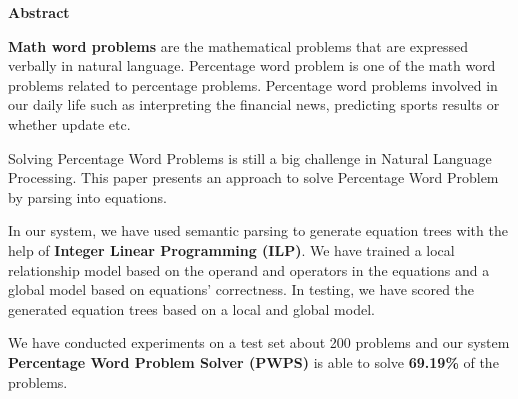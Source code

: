 \documentclass[document.tex]{subfiles}
\begin{document}
	\begin{center}
		\textbf{{\fontsize{16pt}{18}\selectfont Abstract}}
		\vspace{1cm}
	\end{center}
	
	\noindent \textbf{Math word problems} are the mathematical problems
	that are expressed verbally in natural language. Percentage word problem is one of the math word problems related to percentage problems. Percentage word problems involved in our daily life such as interpreting the financial news, predicting sports results or whether update etc. 
	
	
	\noindent Solving Percentage Word Problems is still a big challenge in Natural Language Processing. This paper	presents an approach to solve Percentage Word Problem by parsing into equations. 
	
	\noindent In our system, we have used semantic parsing to generate equation trees with the help of \textbf{Integer Linear Programming (ILP)}. We have trained a local relationship model
	based on the operand and operators in the equations and a global model based on equations’ correctness. In testing, we have scored the generated equation trees based on a local and global model.
	
	\noindent We have conducted experiments on a test set about 200 problems and our system \textbf{Percentage Word Problem Solver (PWPS)} is able to solve \textbf{69.19\%} of the problems.
	
	\clearpage
	
\end{document}
